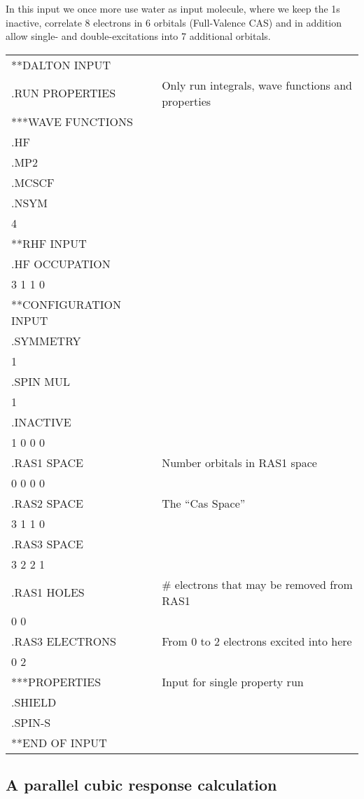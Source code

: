 In this input we once more use water as input molecule,
where we keep
the 1s inactive, correlate 8 electrons in 6 orbitals (Full-Valence
CAS) and in addition allow single- and double-excitations into
7 additional orbitals.

{\ttfamily
\begin{tabular}{ll}
**DALTON INPUT\\
.RUN PROPERTIES\hspace{3cm} & Only run integrals, wave
functions and properties\\
***WAVE FUNCTIONS\\
.HF\\
.MP2\\
.MCSCF\\
.NSYM\\
 4\\
**RHF INPUT\\
.HF OCCUPATION\\
 3 1 1 0\\
**CONFIGURATION INPUT\\
.SYMMETRY\\
 1\\
.SPIN MUL\\
 1\\
.INACTIVE\\
 1 0 0 0\\
.RAS1 SPACE & Number orbitals in RAS1 space\\
 0 0 0 0\\
.RAS2 SPACE & The ``Cas Space''\\
 3 1 1 0\\
.RAS3 SPACE\\
 3 2 2 1\\
.RAS1 HOLES & \# electrons that may be removed from RAS1\\
 0 0\\
.RAS3 ELECTRONS & From 0 to 2 electrons excited into here\\
 0 2\\
***PROPERTIES & Input for single property run\\
.SHIELD\\
.SPIN-S\\
**END OF INPUT\\
\end{tabular}}

\subsection{A parallel cubic response calculation}

